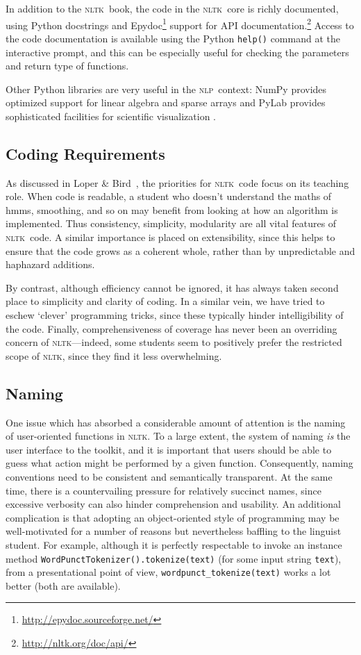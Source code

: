 \documentclass[11pt]{article}
\newcommand{\NLP}{\textsc{nlp}}
\newcommand{\NLTK}{\textsc{nltk}}
\newcommand{\code}[1]{\texttt{\small #1}}
\begin{document}
In addition to the \NLTK\ book, the code in the \NLTK\ core is richly
documented, using Python docstrings and
Epydoc\footnote{\url{http://epydoc.sourceforge.net/}} support
for API documentation.\footnote{\url{http://nltk.org/doc/api/}} Access
to the code documentation is available using the Python \code{help()}
command at the interactive prompt, and this can be especially useful
for checking the parameters and return type of functions.

Other Python libraries are very useful in the \NLP\ context: NumPy
provides optimized support for linear algebra and sparse
arrays \cite{numpy} and PyLab provides
sophisticated facilities for scientific
visualization \cite{matplotlib}.

\subsection{Coding Requirements}

As discussed in Loper \& Bird~, the priorities for \NLTK\ code
focus on its teaching role. When code is readable, a student who
doesn't understand the maths of {\sc hmm}s, smoothing, and so on may benefit
from looking at how an algorithm is implemented. Thus consistency,
simplicity, modularity are all vital features of \NLTK\ code. A
similar importance is placed on extensibility, since this helps to
ensure that the code grows as a coherent whole, rather than by
unpredictable and haphazard additions.  

By contrast, although efficiency cannot be ignored, it has
always taken second place to simplicity and clarity of coding. In a
similar vein, we have tried to eschew `clever' programming tricks,
since these typically hinder intelligibility of the code.  Finally,
comprehensiveness of coverage has never been an overriding concern of
\NLTK---indeed, some students seem to positively prefer the restricted
scope of \NLTK, since they find it less overwhelming. 


\subsection{Naming}

One issue which has absorbed a considerable amount of attention is the
naming of user-oriented functions in \NLTK. To a large extent, the
system of naming \emph{is} the user interface to the toolkit, and it is
important that users should be able to guess what action might be
performed by a given function. Consequently, naming conventions need
to be consistent and semantically transparent. At the same time, there is a
countervailing pressure for relatively succinct names, since excessive verbosity
can also hinder comprehension and usability. An additional
complication is that adopting an object-oriented style of programming
may be well-motivated for a number of reasons but nevertheless
baffling to the linguist student. For example, although it is
perfectly respectable to invoke an instance method
\code{WordPunctTokenizer().tokenize(text)} (for some input
string \code{text}), from a presentational point of view, 
\code{wordpunct\_tokenize(text)} works a lot better
(both are available).
\end{document}
